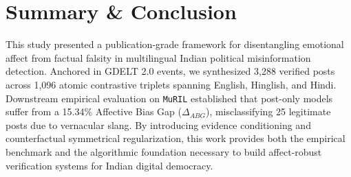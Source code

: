 \documentclass[11pt,a4paper]{article}
\begin{document}
\section{Summary \& Conclusion}
This study presented a publication-grade framework for disentangling emotional affect from factual falsity in multilingual Indian political misinformation detection. Anchored in GDELT 2.0 events, we synthesized 3,288 verified posts across 1,096 atomic contrastive triplets spanning English, Hinglish, and Hindi. Downstream empirical evaluation on \texttt{MuRIL} established that post-only models suffer from a 15.34\% Affective Bias Gap ($\Delta_{ABG}$), misclassifying 25 legitimate posts due to vernacular slang. By introducing evidence conditioning and counterfactual symmetrical regularization, this work provides both the empirical benchmark and the algorithmic foundation necessary to build affect-robust verification systems for Indian digital democracy.
\end{document}
